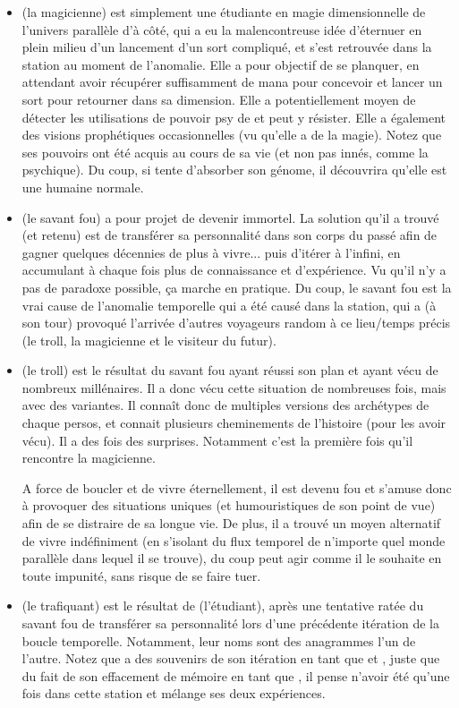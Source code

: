 {\begin{itemize}
		\item \nmPlayerVI (la magicienne) est simplement une étudiante en magie dimensionnelle de l'univers parallèle d'à côté, qui a eu la malencontreuse idée d'éternuer en plein milieu d'un lancement d'un sort compliqué, et s'est retrouvée dans la station au moment de l'anomalie. Elle a pour objectif de se planquer, en attendant avoir récupérer suffisamment de mana pour concevoir et lancer un sort pour retourner dans sa dimension. Elle a potentiellement moyen de détecter les utilisations de pouvoir psy de \nmPlayerIX et peut y résister. Elle a également des visions prophétiques occasionnelles (vu qu'elle a de la magie). Notez que ses pouvoirs ont été acquis au cours de sa vie (et non pas innés, comme la psychique). Du coup, si \nmPlayerX tente d'absorber son génome, il découvrira qu'elle est une humaine normale.
		
		\item \nmPlayerI (le savant fou) a pour projet de devenir immortel. La solution qu'il a trouvé (et retenu) est de transférer sa personnalité dans son corps du passé afin de gagner quelques décennies de plus à vivre... puis d'itérer à l'infini, en accumulant à chaque fois plus de connaissance et d'expérience. Vu qu'il n'y a pas de paradoxe possible, ça marche en pratique. Du coup, le savant fou est la vrai cause de l'anomalie temporelle qui a été causé dans la station, qui a (à son tour) provoqué l'arrivée d'autres voyageurs random à ce lieu/temps précis (le troll, la magicienne et le visiteur du futur).
		
		\item \nmPlayerIV (le troll) est le résultat du savant fou ayant réussi son plan et ayant vécu de nombreux millénaires. Il a donc vécu cette situation de nombreuses fois, mais avec des variantes. Il connaît donc de multiples versions des archétypes de chaque persos, et connait plusieurs cheminements de l'histoire (pour les avoir vécu). Il a des fois des surprises. Notamment c'est la première fois qu'il rencontre la magicienne.
		
		A force de boucler et de vivre éternellement, il est devenu fou et s'amuse donc à provoquer des situations uniques (et humouristiques de son point de vue) afin de se distraire de sa longue vie. De plus, il a trouvé un moyen alternatif de vivre indéfiniment (en s'isolant du flux temporel de n'importe quel monde parallèle dans lequel il se trouve), du coup peut agir comme il le souhaite en toute impunité, sans risque de se faire tuer.
		
		\item \nmPlayerII (le trafiquant) est le résultat de \nmPlayerIII (l'étudiant), après une tentative ratée du savant fou de transférer sa personnalité lors d'une précédente itération de la boucle temporelle. Notamment, leur noms sont des anagrammes l'un de l'autre. Notez que \nmPlayerI a des souvenirs de son itération en tant que \nmPlayerII et \nmPlayerIII, juste que du fait de son effacement de mémoire en tant que \nmPlayerII, il pense n'avoir été qu'une fois dans cette station et mélange ses deux expériences.
		

\end{itemize}}
